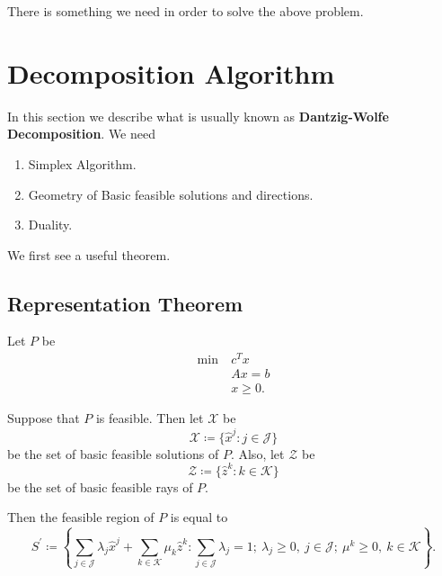 There is something we need in order to solve the above problem.

\section{Decomposition Algorithm}
In this section we describe what is usually known as \textbf{Dantzig-Wolfe Decomposition}. We need
\begin{enumerate}
	\item Simplex Algorithm.
	\item Geometry of Basic feasible solutions and directions.
	\item Duality.
\end{enumerate}

We first see a useful theorem.
\subsection{Representation Theorem}
Let \(P\) be
\begin{align*}
	\min~ & c^Tx     \\
	      & Ax = b   \\
	      & x\geq 0.
\end{align*}

\begin{theorem}
	Suppose that \(P\) is feasible. Then let \(\mathcal{X}\) be
	\[
		\mathcal{X} \coloneqq \{\hat{x}^j \colon j\in \mathcal{J}\}
	\]
	be the set of basic feasible solutions of \(P\). Also, let \(\mathcal{Z}\) be
	\[
		\mathcal{Z}\coloneqq \{\hat{z}^k\colon k\in \mathcal{K}\}
	\]
	be the set of basic feasible rays of \(P\).

	Then the feasible region of \(P\) is equal to
	\[
		S^\prime\coloneqq \left\{\sum\limits_{j\in\mathcal{J}} \lambda_{j} \hat{x}^j + \sum\limits_{k\in\mathcal{K}}\mu_k \hat{z}^k\colon \sum\limits_{j\in\mathcal{J}}\lambda_{j} = 1;\ \lambda_{j}\geq 0,\ j\in \mathcal{J};\ \mu^k\geq 0,\ k\in \mathcal{K}\right\}.
	\]
\end{theorem}

